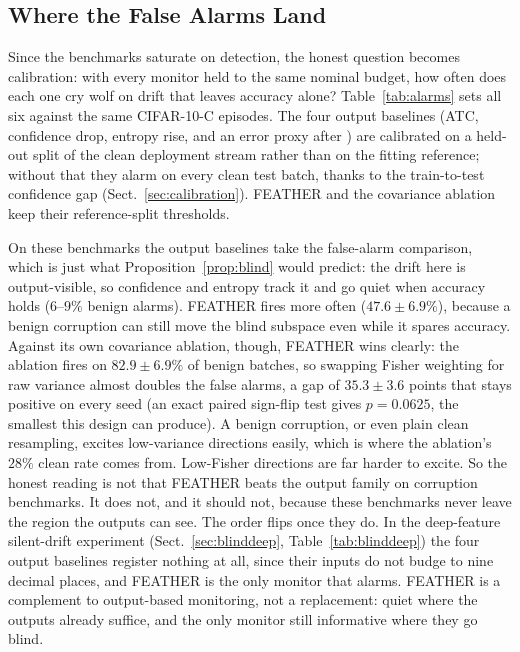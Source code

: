 \documentclass[acmsmall,screen]{acmart}
\theoremstyle{acmdefinition}
\begin{document}
\subsection{Where the False Alarms Land}

Since the benchmarks saturate on detection, the honest question becomes
calibration: with every monitor held to the same nominal budget, how often
does each one cry wolf on drift that leaves accuracy alone?
Table~\ref{tab:alarms} sets all six against the same CIFAR-10-C episodes. The
four output baselines (ATC, confidence drop, entropy rise, and an error proxy
after \cite{amoukou2024sequential}) are calibrated on a held-out split of the
clean deployment stream rather than on the fitting reference; without that
they alarm on every clean test batch, thanks to the train-to-test confidence
gap (Sect.~\ref{sec:calibration}). FEATHER and the covariance ablation keep
their reference-split thresholds.

On these benchmarks the output baselines take the false-alarm comparison,
which is just what Proposition~\ref{prop:blind} would predict: the drift here
is output-visible, so confidence and entropy track it and go quiet when
accuracy holds ($6$--$9\%$ benign alarms). FEATHER fires more often
($47.6 \pm 6.9\%$), because a benign corruption can still move the blind
subspace even while it spares accuracy. Against its own covariance ablation,
though, FEATHER wins clearly: the ablation fires on $82.9 \pm 6.9\%$ of benign
batches, so swapping Fisher weighting for raw variance almost doubles the
false alarms, a gap of $35.3 \pm 3.6$ points that stays positive on every seed
(an exact paired sign-flip test gives $p = 0.0625$, the smallest this design
can produce). A benign corruption, or even plain clean resampling, excites
low-variance directions easily, which is where the ablation's $28\%$ clean
rate comes from. Low-Fisher directions are far harder to excite. So the honest
reading is not that FEATHER beats the output family on corruption benchmarks.
It does not, and it should not, because these benchmarks never leave the
region the outputs can see. The order flips once they do. In the deep-feature
silent-drift experiment (Sect.~\ref{sec:blinddeep},
Table~\ref{tab:blinddeep}) the four output baselines register nothing at all,
since their inputs do not budge to nine decimal places, and FEATHER is the
only monitor that alarms. FEATHER is a complement to output-based monitoring,
not a replacement: quiet where the outputs already suffice, and the only
monitor still informative where they go blind.
\end{document}
